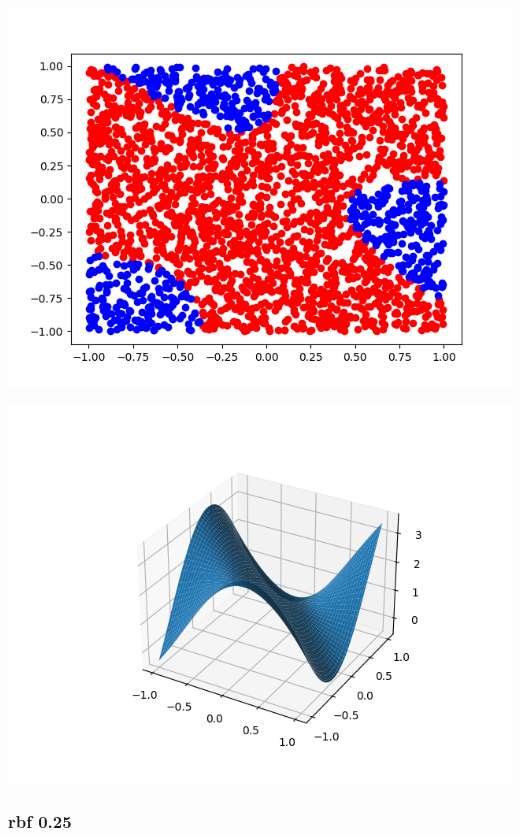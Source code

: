 \documentclass[11pt]{article}
\begin{document}
\begin{center}
\includegraphics[scale=0.7]{./res/ac_points_sigmoid_0.25.png}
\end{center}

\begin{center}
\includegraphics[scale=0.7]{./res/ac_surface_sigmoid_0.25.png}
\end{center}

\subsubsection*{rbf 0.25}
\label{sec:org85a4f2d}
\end{document}

